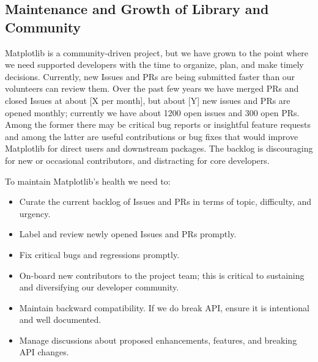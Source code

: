 \documentclass[11pt,letterpaper]{article}  %
\begin{document}
\subsection{Maintenance and Growth of Library and Community}


Matplotlib is a community-driven project, but we have grown to the
point where we need supported developers with the time to organize,
plan, and make timely decisions.  Currently, new Issues and PRs are
being submitted faster than our volunteers can review them.  Over the
past few years we have merged PRs and closed Issues at about [X per
  month], but about [Y] new issues and PRs are opened monthly;
currently we have about 1200 open issues and 300 open PRs.  Among the
former there may be critical bug reports or insightful feature
requests and among the latter are useful contributions or bug fixes
that would improve Matplotlib for direct users and downstream
packages.  The backlog is discouraging for new or occasional
contributors, and distracting for core developers.

To maintain Matplotlib's health we need to:

\begin{itemize}[noitemsep]
\item Curate the current backlog of Issues and PRs
  in terms of topic, difficulty, and urgency.
\item Label and review newly opened Issues and PRs
  promptly.
\item Fix critical bugs and regressions promptly.
\item On-board new contributors to the project team; this is critical to
  sustaining and diversifying our developer community.
\item Maintain backward compatibility.  If we do break API, ensure it
  is intentional and well documented.
\item Manage discussions about proposed enhancements, features, and
  breaking API changes.
\end{itemize}
\end{document}
